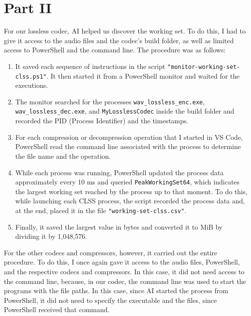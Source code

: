 \chapter{Part II}

For our lossless codec, AI helped us discover the working set. To do this, I had to give it access to the audio files and the codec's build folder, as well as limited access to PowerShell and the command line. The procedure was as follows:

\begin{enumerate}
    \item It saved each sequence of instructions in the script \texttt{"monitor-working-set-clss.ps1"}. It then started it from a PowerShell monitor and waited for the executions.

    \item The monitor searched for the processes \texttt{wav\_lossless\_enc.exe}, \texttt{wav\_lossless\_dec.exe}, and \texttt{MyLosslessCodec} inside the build folder and recorded the PID (Process Identifier) and the timestamps.

    \item For each compression or decompression operation that I started in VS Code, PowerShell read the command line associated with the process to determine the file name and the operation.

    \item While each process was running, PowerShell updated the process data approximately every 10 ms and queried \texttt{PeakWorkingSet64}, which indicates the largest working set reached by the process up to that moment. To do this, while launching each CLSS process, the script recorded the process data and, at the end, placed it in the file \texttt{"working-set-clss.csv"}.

    \item Finally, it saved the largest value in bytes and converted it to MiB by dividing it by 1,048,576.
\end{enumerate}

For the other codecs and compressors, however, it carried out the entire procedure. To do this, I once again gave it access to the audio files, PowerShell, and the respective codecs and compressors. In this case, it did not need access to the command line, because, in our codec, the command line was used to start the programs with the file paths. In this case, since AI started the process from PowerShell, it did not need to specify the executable and the files, since PowerShell received that command.

